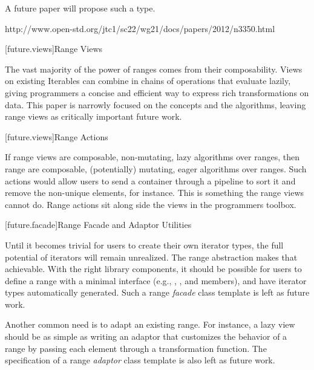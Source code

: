 \pnum
A future paper will propose such a type.

http://www.open-std.org/jtc1/sc22/wg21/docs/papers/2012/n3350.html

[future.views]{Range Views}

\pnum
The vast majority of the power of ranges comes from their composability. Views on existing Iterables
can combine in chains of operations that evaluate lazily, giving programmers a concise and efficient
way to express rich transformations on data. This paper is narrowly focused on the concepts and the
algorithms, leaving range views as critically important future work.

[future.views]{Range Actions}

\pnum
If range views are composable, non-mutating, lazy algorithms over ranges, then range 
are composable, (potentially) mutating, eager algorithms over ranges. Such actions would allow users
to send a container through a pipeline to sort it and remove the non-unique elements, for instance.
This is something the range views cannot do. Range actions sit along side the views in the
programmers toolbox.

[future.facade]{Range Facade and Adaptor Utilities}

\pnum
Until it becomes trivial for users to create their own iterator types, the full potential of
iterators will remain unrealized. The range abstraction makes that achievable. With the right library
components, it should be possible for users to define a range with a minimal interface
(e.g., , , and  members), and have iterator types
automatically generated. Such a range \textit{facade} class template is left as future work.

\pnum
Another common need is to adapt an existing range. For instance, a lazy  view
should be as simple as writing an adaptor that customizes the behavior of a range by passing each
element through a transformation function. The specification of a range \textit{adaptor} class
template is also left as future work.
